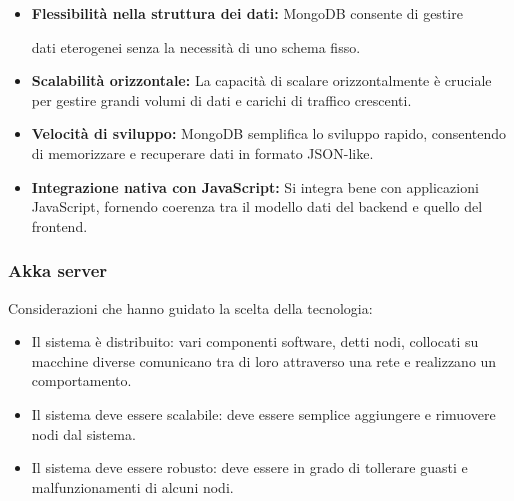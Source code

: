 \begin{itemize}
      \item \textbf{Flessibilità nella struttura dei dati:} MongoDB consente di gestire

            dati eterogenei senza la necessità di uno schema fisso.

      \item \textbf{Scalabilità orizzontale:} La capacità di scalare orizzontalmente è
            cruciale per gestire grandi volumi di dati e carichi di traffico crescenti.

      \item \textbf{Velocità di sviluppo:} MongoDB semplifica lo sviluppo rapido,
            consentendo di memorizzare e recuperare dati in formato JSON-like.

      \item \textbf{Integrazione nativa con JavaScript:} Si integra bene con applicazioni
            JavaScript, fornendo coerenza tra il modello dati del backend e quello del frontend.
\end{itemize}

\subsubsection{Akka server}



Considerazioni che hanno guidato la scelta della tecnologia:
\begin{itemize}
      \item Il sistema è distribuito: vari componenti software, detti nodi, collocati su macchine diverse comunicano tra di loro attraverso una rete e realizzano un comportamento.
      \item Il sistema deve essere scalabile: deve essere semplice aggiungere e rimuovere nodi dal sistema.
      \item Il sistema deve essere robusto: deve essere in grado di tollerare guasti e malfunzionamenti di alcuni nodi.
\end{itemize}







